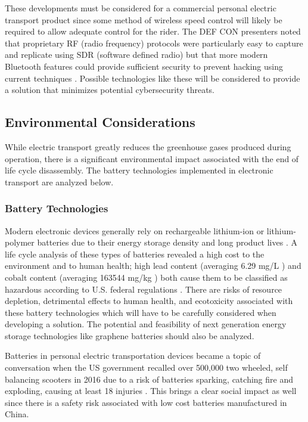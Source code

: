 These developments must be considered for a commercial personal electric transport product since some method of wireless speed control will likely be required to allow adequate control for the rider. The DEF CON presenters noted that proprietary RF (radio frequency) protocols were particularly easy to capture and replicate using SDR (software defined radio) \cite{Radio}\cite{DEFCON} but that more modern Bluetooth features could provide sufficient security to prevent hacking using current techniques \cite{DEFCON}. Possible technologies like these will be considered to provide a solution that minimizes potential cybersecurity threats.

\subsection{Environmental Considerations}
While electric transport greatly reduces the greenhouse gases produced during operation, there is a significant environmental impact associated with the end of life cycle disassembly. The battery technologies implemented in electronic transport are analyzed below.
\subsubsection{Battery Technologies}
Modern electronic devices generally rely on rechargeable lithium-ion or lithium-polymer batteries due to their energy storage density and long product lives \cite{BatteryRecharge}. A life cycle analysis of these types of batteries revealed a high cost to the environment and to human health; high lead content (averaging 6.29 mg/L \cite{BatteryRecharge}) and cobalt content (averaging 163544 mg/kg \cite{BatteryRecharge}) both cause them to be classified as hazardous according to U.S. federal regulations \cite{BatteryRecharge}. There are risks of  resource depletion, detrimental effects to human health, and ecotoxicity associated with these battery technologies \cite{BatteryRecharge} which will have to be carefully considered when developing a solution. The potential and feasibility of next generation energy storage technologies like graphene batteries \cite{Graphene} should also be analyzed.

Batteries in personal electric transportation devices became a topic of conversation when the US government recalled over 500,000 two wheeled, self balancing scooters in 2016 due to a risk of batteries sparking, catching fire and exploding, causing at least 18 injuries \cite{CBCArticle}. This brings a clear social impact as well since there is a safety risk associated with low cost batteries manufactured in China\cite{CBCArticle}.

